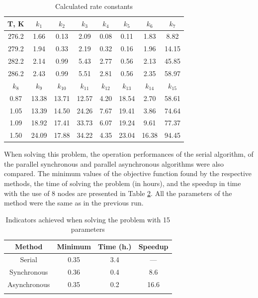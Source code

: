 \documentclass{svproc}
\begin{document}
\begin{table}[ht]
\caption{Calculated rate constants}\label{table_res2}
\begin{center}
\begin{tabular}{cccccccc}
\hline
T, K & $k_1$ & $k_2$ & $k_3$ & $k_4$ & $k_5$ & $k_6$ & $k_7$\\
\hline\rule{0pt}{12pt}
276.2 & 1.66 & 0.13 & 2.09 & 0.08 & 0.11 & 1.83 & 8.82 \\
279.2 & 1.94 & 0.33 & 2.19 & 0.32 & 0.16 & 1.96 & 14.15\\
282.2 & 2.14 & 0.99 & 5.43 & 2.77 & 0.56 & 2.13 & 45.85\\
286.2 & 2.43 & 0.99 & 5.51 & 2.81 & 0.56  & 2.35 & 58.97\\
\hline
$k_8$ & $k_9$ & $k_{10}$ & $k_{11}$ & $k_{12}$ & $k_{13}$ & $k_{14}$ & $k_{15}$ \\
\hline\rule{0pt}{12pt}
0.87 & 13.38 & 13.71 & 12.57 & 4.20 & 18.54 & 2.70 & 58.61\\
1.05 & 13.39 & 14.50 & 24.26 & 7.67 & 19.41 & 3.86 & 74.64\\
1.09 & 18.92 & 17.41 & 33.73 & 6.07 & 19.24 & 9.61 & 77.37\\
1.50 & 24.09 & 17.88 & 34.22 & 4.35 & 23.04 & 16.38 & 94.45\\[2pt]
\hline
\end{tabular}\end{center}\end{table}

When solving this problem, the operation performances of the serial algorithm, of the parallel synchronous and parallel asynchronous algorithms were also compared.  
The minimum values of the objective function found by the respective methods, the time of solving the problem (in hours), and the speedup in time with the use of 8 nodes are presented in Table \ref{table_15D}. All the parameters of the method were the same as in the previous run. 

\begin{table}
\caption{Indicators achieved when solving the problem with 15 parameters}
\label{table_15D}
\begin{center}
\begin{tabular}{cccc}
\hline\noalign{\smallskip}
 Method      & Minimum  & Time (h.) & Speedup \\
\hline\noalign{\smallskip}
Serial       & 0.35   &   3.4     &  ---        \\
Synchronous  & 0.36   &   0.4     &   8.6       \\
Asynchronous & 0.35   &   0.2     &   16.6       \\
\noalign{\smallskip}\hline
\end{tabular}\end{center}\end{table}
\end{document}
